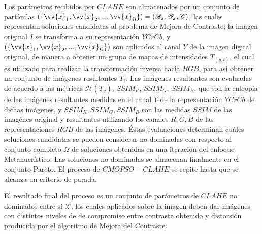                 Los parámetros recibidos por $CLAHE$ son almacenados por un conjunto de partículas $(\{\vv{x}_1, \vv{x}_2,...,\vv{x}_{\Omega}\})=(\mathscr{R}_x,\mathscr{Y}_x,\mathscr{C})$, las cuales representan soluciones candidatas al problema de Mejora de Contraste; la imagen original $I$ se transforma a su representación $YCrCb$, y $(\{\vv{x}_1, \vv{x}_2,...,\vv{x}_{\Omega}\})$ son aplicados al canal $Y$ de la imagen digital original, de manera a obtener un grupo de mapas  de intensidades $T_(y,i)$, el cual es utilizado para realizar la transformación inversa hacia $RGB$, para así obtener un conjunto de imágenes resultantes $T_i$. 
                Las imágenes resultantes son evaluadas de acuerdo a las métricas $\mathscr{H}(T_y)$, $SSIM_R$, $SSIM_G$, $SSIM_B$, que son la entropía de las imágenes resultantes medidas en el canal $Y$ de la representación $YCrCb$ de dichas imágenes, y $SSIM_R,SSIM_G,SSIM_B$ son las medidas $SSIM$ de las imagénes original y resultantes utilizando los canales $R,G,B$ de las representaciones $RGB$ de las imágenes. Éstas evaluaciones determinan cuáles soluciones candidatas se pueden considerar no dominadas con respecto al conjunto completo $\Omega$ de soluciones obtenidas en una iteración del enfoque Metahuerístico. Las soluciones no dominadas se almacenan finalmente en el conjunto Pareto. El proceso de $CMOPSO-CLAHE$ se repite hasta que se alcanza un criterio de parada.

                El resultado final del proceso es un conjunto de parámetros de $CLAHE$ no dominados entre sí $\mathscr{X}$\label{symbol:nodominadas}, los cuales aplicados sobre la imagen deben dar imágenes con distintos niveles de de compromiso entre contraste obtenido y distorsión producida por el algoritmo de Mejora del Contraste.  



